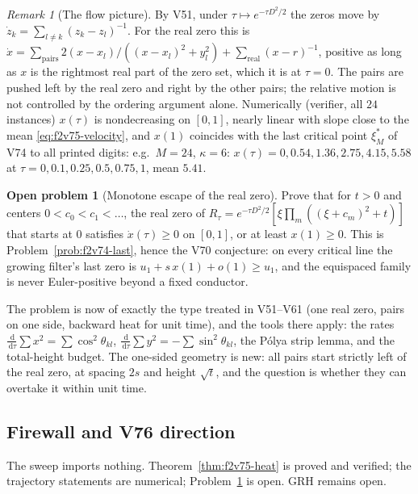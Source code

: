 \documentclass[11pt]{article}
\theoremstyle{definition}
\newtheorem{problem}[theorem]{Open problem}
\theoremstyle{remark}
\newtheorem{remark}[theorem]{Remark}
\newcommand{\dd}{\,\mathrm d}
\begin{document}
\begin{remark}[The flow picture]
\label{rem:f2v75-flow}
By V51, under \(\tau\mapsto e^{-\tau D^2/2}\) the zeros move by
\(\dot z_k=\sum_{l\ne k}(z_k-z_l)^{-1}\).  For the real zero this is
\(\dot x=\sum_{\text{pairs}}2(x-x_l)/((x-x_l)^2+y_l^2)+\sum_{\text{real}}(x-r)^{-1}\),
positive as long as \(x\) is the rightmost real part of the zero set,
which it is at \(\tau=0\).  The pairs are pushed left by the real zero
and right by the other pairs; the relative motion is not controlled by
the ordering argument alone.  Numerically (verifier, all \(24\)
instances) \(x(\tau)\) is nondecreasing on \([0,1]\), nearly linear with
slope close to the mean \eqref{eq:f2v75-velocity}, and \(x(1)\) coincides
with the last critical point \(\xi^*_M\) of V74 to all printed digits:
e.g.\ \(M=24\), \(\kappa=6\): \(x(\tau)=0,0.54,1.36,2.75,4.15,5.58\) at
\(\tau=0,0.1,0.25,0.5,0.75,1\), mean \(5.41\).
\end{remark}

\begin{problem}[Monotone escape of the real zero]
\label{prob:f2v75-monotone}
Prove that for \(t>0\) and centers \(0<c_0<c_1<\dots\), the real zero of
\(R_\tau=e^{-\tau D^2/2}[\xi\prod_m((\xi+c_m)^2+t)]\) that starts at
\(0\) satisfies \(\dot x(\tau)\ge0\) on \([0,1]\), or at least
\(x(1)\ge0\).  This is Problem~\ref{prob:f2v74-last}, hence the V70
conjecture: on every critical line the growing filter's last zero is
\(u_1+s\,x(1)+o(1)\ge u_1\), and the equispaced family is never
Euler-positive beyond a fixed conductor.
\end{problem}

The problem is now of exactly the type treated in V51--V61 (one real
zero, pairs on one side, backward heat for unit time), and the tools
there apply: the rates \(\frac{\dd}{\dd\tau}\sum x^2=\sum\cos^2\theta_{kl}\),
\(\frac{\dd}{\dd\tau}\sum y^2=-\sum\sin^2\theta_{kl}\), the Pólya strip
lemma, and the total-height budget.  The one-sided geometry is new: all
pairs start strictly left of the real zero, at spacing \(2s\) and height
\(\sqrt t\), and the question is whether they can overtake it within
unit time.

\subsection*{Firewall and V76 direction}
\label{fire:f2v75}
The sweep imports nothing.  Theorem~\ref{thm:f2v75-heat} is proved and
verified; the trajectory statements are numerical;
Problem~\ref{prob:f2v75-monotone} is open.  GRH remains open.
\end{document}
